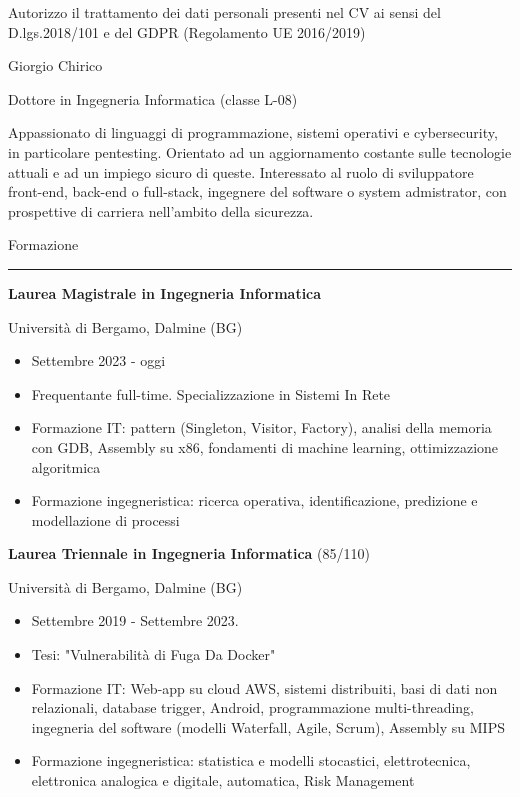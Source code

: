 \documentclass[a4paper]{letter}
\begin{document}
\hfill
\begin{minipage}[t]{0.65\textwidth}
\setlength{\baselineskip}{1.4\baselineskip}

{\tiny Autorizzo il trattamento dei dati personali presenti nel CV ai sensi del D.lgs.2018/101 e del GDPR (Regolamento UE 2016/2019)}
\vspace{0.3cm}


{\huge Giorgio Chirico}

{\large Dottore in Ingegneria Informatica (classe L-08)}

\vspace{0.5cm}
 
Appassionato di linguaggi di programmazione, sistemi operativi e cybersecurity, in particolare pentesting. Orientato ad un aggiornamento costante sulle tecnologie attuali e ad un impiego sicuro di queste. Interessato al ruolo di sviluppatore front-end, back-end o full-stack, ingegnere del software o system admistrator, con prospettive di carriera nell'ambito della sicurezza.

\vspace{0.5cm}

{\large Formazione}
\rule{\linewidth}{0.4pt}

{\large \textbf{Laurea Magistrale in Ingegneria Informatica}}

{\small Università di Bergamo, Dalmine (BG)}
\begin{itemize}
    \item Settembre 2023 - oggi
    \item Frequentante full-time. Specializzazione in Sistemi In Rete
    \item Formazione IT: pattern (Singleton, Visitor, Factory), analisi della memoria con GDB, Assembly su x86, fondamenti di machine learning, ottimizzazione algoritmica
    \item Formazione ingegneristica: ricerca operativa, identificazione, predizione e modellazione di processi 
\end{itemize}

{\large \textbf{Laurea Triennale in Ingegneria Informatica} \small (85/110)}

{\small Università di Bergamo, Dalmine (BG)}
\begin{itemize}
    \item Settembre 2019 - Settembre 2023.
    \item Tesi: "Vulnerabilità di Fuga Da Docker"
    \item Formazione IT: Web-app su cloud AWS, sistemi distribuiti, basi di dati non relazionali, database trigger, Android, programmazione multi-threading, ingegneria del software (modelli Waterfall, Agile, Scrum), Assembly su MIPS
    \item Formazione ingegneristica: statistica e modelli stocastici, elettrotecnica, elettronica analogica e digitale, automatica, Risk Management
\end{itemize}


\end{minipage}
\end{document}
